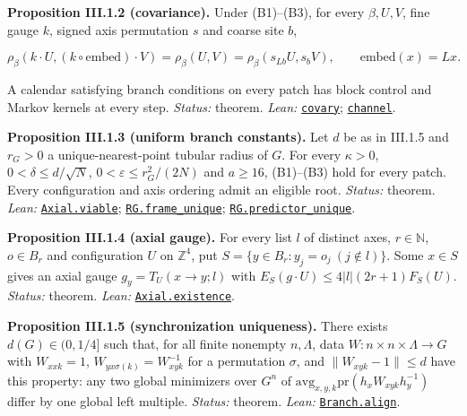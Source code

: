 \documentclass[
  letterpaper,
  11pt]{article}
\newcounter{none} %
\begin{document}
\textbf{Proposition III.1.2 (covariance).} Under (B1)--(B3), for every
\(\beta,U,V\), fine gauge \(k\), signed axis permutation \(s\) and
coarse site \(b\),

\[\rho_\beta(k\cdot U,(k\circ\mathrm{embed})\cdot V)=\rho_\beta(U,V)=\rho_\beta(s_{Lb}U,s_bV),\qquad\mathrm{embed}(x)=Lx.\]

A calendar satisfying branch conditions on every patch has block control
and Markov kernels at every step. \emph{Status:} theorem. \emph{Lean:}
\href{https://github.com/yang-mills-group/OpenAI-YM-20261028/blob/3456e5e75cf8d4cd558955a5c7638fba2d68f464/YM/Branch/Covariant.lean\#L56-L67}{\texttt{covary}};
\href{https://github.com/yang-mills-group/OpenAI-YM-20261028/blob/3456e5e75cf8d4cd558955a5c7638fba2d68f464/YM/Branch/Covariant.lean\#L50-L54}{\texttt{channel}}.

\textbf{Proposition III.1.3 (uniform branch constants).} Let \(d\) be as
in III.1.5 and \(r_G>0\) a unique-nearest-point tubular radius of \(G\).
For every \(\kappa>0\), \(0<\delta\le d/\sqrt N\),
\(0<\varepsilon\le r_G^2/(2N)\) and \(a\ge16\), (B1)--(B3) hold for
every patch. Every configuration and axis ordering admit an eligible
root. \emph{Status:} theorem. \emph{Lean:}
\href{https://github.com/yang-mills-group/OpenAI-YM-20261028/blob/3456e5e75cf8d4cd558955a5c7638fba2d68f464/YM/Branch/Pick.lean\#L137-L142}{\texttt{Axial.viable}};
\href{https://github.com/yang-mills-group/OpenAI-YM-20261028/blob/3456e5e75cf8d4cd558955a5c7638fba2d68f464/YM/Branch/Uniform.lean\#L18-L56}{\texttt{RG.frame\_unique}};
\href{https://github.com/yang-mills-group/OpenAI-YM-20261028/blob/3456e5e75cf8d4cd558955a5c7638fba2d68f464/YM/Branch/Uniform.lean\#L58-L63}{\texttt{RG.predictor\_unique}}.

\textbf{Proposition III.1.4 (axial gauge).} For every list \(l\) of
distinct axes, \(r\in\mathbb N\), \(o\in B_r\) and configuration \(U\)
on \(\mathbb Z^4\), put \(S=\{y\in B_r:y_j=o_j\ (j\notin l)\}\). Some
\(x\in S\) gives an axial gauge \(g_y=T_U(x\to y;l)\) with
\(E_S(g\cdot U)\le4|l|(2r+1)F_S(U)\). \emph{Status:} theorem.
\emph{Lean:}
\href{https://github.com/yang-mills-group/OpenAI-YM-20261028/blob/3456e5e75cf8d4cd558955a5c7638fba2d68f464/YM/Branch/Pick.lean\#L80-L105}{\texttt{Axial.existence}}.

\textbf{Proposition III.1.5 (synchronization uniqueness).} There exists
\(d(G)\in(0,1/4]\) such that, for all finite nonempty \(n,\Lambda\),
data \(W:n\times n\times\Lambda\to G\) with \(W_{xxk}=1\),
\(W_{yx\sigma(k)}=W_{xyk}^{-1}\) for a permutation \(\sigma\), and
\(\|W_{xyk}-1\|\le d\) have this property: any two global minimizers
over \(G^n\) of \(\mathrm{avg}_{x,y,k}\mathrm{pr}(h_xW_{xyk}h_y^{-1})\)
differ by one global left multiple. \emph{Status:} theorem. \emph{Lean:}
\href{https://github.com/yang-mills-group/OpenAI-YM-20261028/blob/3456e5e75cf8d4cd558955a5c7638fba2d68f464/YM/Branch/Synchronize.lean\#L232-L272}{\texttt{Branch.align}}.
\end{document}
